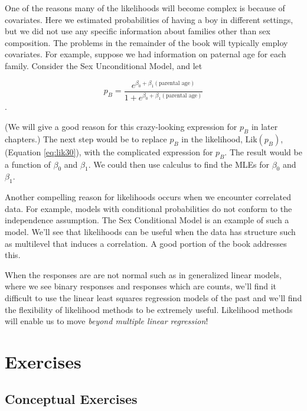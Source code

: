 \documentclass[
]{krantz}
\newcommand{\Lik}{\mathrm{Lik}}
\begin{document}
One of the reasons many of the likelihoods will become complex is because of covariates. Here we estimated probabilities of having a boy in different settings, but we did not use any specific information about families other than sex composition. The problems in the remainder of the book will typically employ covariates. For example, suppose we had information on paternal age for each family. Consider the Sex Unconditional Model, and let

\[
p_B= \frac{e^{\beta_0+\beta_1(\textrm{parental age})}}
{1+e^{\beta_0+\beta_1(\textrm{parental age})}}
\].

(We will give a good reason for this crazy-looking expression for \(p_B\) in later chapters.) The next step would be to replace \(p_B\) in the likelihood, \(\Lik(p_B)\), (Equation \eqref{eq:lik30}), with the complicated expression for \(p_B\). The result would be a function of \(\beta_0\) and \(\beta_1\). We could then use calculus to find the MLEs for \(\beta_0\) and \(\beta_1\).

Another compelling reason for likelihoods occurs when we encounter correlated data. For example, models with conditional probabilities do not conform to the independence assumption. The Sex Conditional Model is an example of such a model. We'll see that likelihoods can be useful when the data has structure such as multilevel that induces a correlation. A good portion of the book addresses this.

When the responses are are not normal such as in generalized linear models, where we see binary responses and responses which are counts, we'll find it difficult to use the linear least squares regression models of the past and we'll find the flexibility of likelihood methods to be extremely useful. Likelihood methods will enable us to move \emph{beyond multiple linear regression}!

\hypertarget{exercises-1}{%
\section{Exercises}\label{exercises-1}}

\hypertarget{conceptual-exercises-1}{%
\subsection{Conceptual Exercises}\label{conceptual-exercises-1}}
\end{document}
